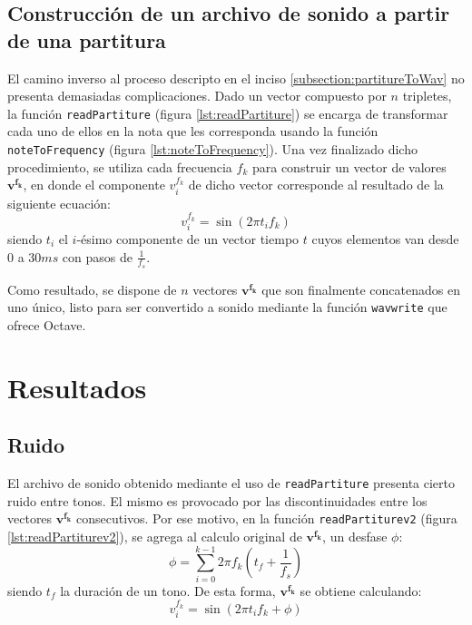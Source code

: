 \documentclass[journal, monochrome]{IEEEtran}
\begin{document}
\subsection{Construcción de un archivo de sonido a partir de una partitura}
El camino inverso al proceso descripto en el inciso \ref{subsection:partitureToWav} no presenta demasiadas complicaciones. Dado un vector
compuesto por $n$ tripletes, la función \texttt{readPartiture} (figura \ref{lst:readPartiture}) se encarga de transformar cada uno de ellos en la nota que les corresponda usando la función \texttt{noteToFrequency} (figura \ref{lst:noteToFrequency}).
Una vez finalizado dicho procedimiento, se utiliza cada frecuencia $f_k$ para construir un vector de valores $\mathbf{v^{f_k}}$, en donde el componente $v^{f_k}_i$ de dicho vector corresponde al resultado de la siguiente ecuación:
\begin{equation}
v^{f_k}_i = \sin(2\pi t_i f_k)
\end{equation}
siendo $t_i$ el $i$-ésimo componente de un vector tiempo $t$ cuyos elementos van desde $0$ a $30 ms$ con pasos de $\tfrac{1}{f_s}$.

Como resultado, se dispone de $n$ vectores $\mathbf{v^{f_k}}$ que son finalmente concatenados en uno único, listo para
ser convertido a sonido mediante la función \texttt{wavwrite} que ofrece Octave.



\vspace{1cm}
\section{Resultados}
\label{section:results}
\vspace{0.5cm}

\subsection{Ruido}

El archivo de sonido obtenido mediante el uso de \texttt{readPartiture} presenta cierto ruido entre tonos. El mismo es provocado por las discontinuidades entre los vectores $\mathbf{v^{f_k}}$ consecutivos. Por ese motivo, en la función \texttt{readPartiturev2} (figura \ref{lst:readPartiturev2}), se agrega al calculo original de $\mathbf{v^{f_k}}$, un desfase $\phi$: \\
\begin{equation}
\phi = \sum_{i=0}^{k-1} 2\pi f_{k}(t_{f}+\frac{1}{f_{s}})
\end{equation}
siendo $t_{f}$ la duración de un tono. De esta forma, $\mathbf{v^{f_k}}$ se obtiene calculando:
\begin{equation}
v^{f_k}_i = \sin(2\pi t_i f_k + \phi)
\end{equation}
\end{document}
